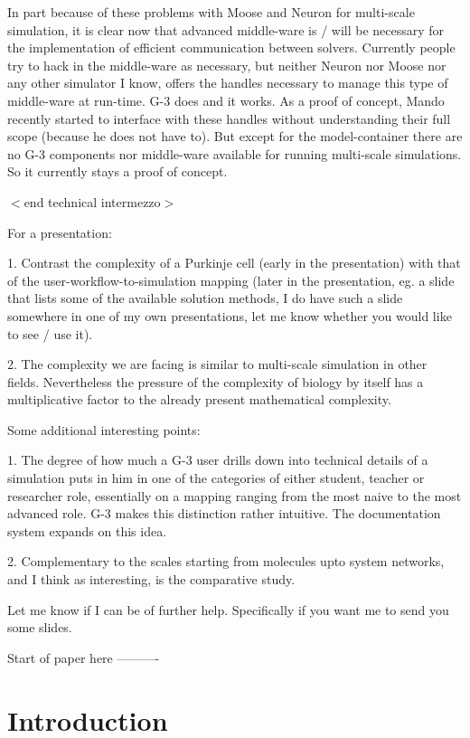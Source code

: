 \documentclass[12pt]{article}
\begin{document}
In part because of these problems with Moose and Neuron for
multi-scale simulation, it is clear now that advanced middle-ware is /
will be necessary for the implementation of efficient communication
between solvers.  Currently people try to hack in the middle-ware as
necessary, but neither Neuron nor Moose nor any other simulator I
know, offers the handles necessary to manage this type of middle-ware
at run-time.  G-3 does and it works.  As a proof of concept, Mando
recently started to interface with these handles without understanding
their full scope (because he does not have to).  But except for the
model-container there are no G-3 components nor middle-ware available
for running multi-scale simulations.  So it currently stays a proof of
concept.

$<$end technical intermezzo$>$

For a presentation:

1. Contrast the complexity of a Purkinje cell (early in the
presentation) with that of the user-workflow-to-simulation mapping
(later in the presentation, eg. a slide that lists some of the
available solution methods, I do have such a slide somewhere in one of
my own presentations, let me know whether you would like to see / use
it).

2. The complexity we are facing is similar to multi-scale simulation
in other fields.  Nevertheless the pressure of the complexity of
biology by itself has a multiplicative factor to the already present
mathematical complexity.

Some additional interesting points:

1. The degree of how much a G-3 user drills down into technical
details of a simulation puts in him in one of the categories of either
student, teacher or researcher role, essentially on a mapping ranging
from the most naive to the most advanced role.  G-3 makes this
distinction rather intuitive.  The documentation system expands on
this idea.

2. Complementary to the scales starting from molecules upto system
networks, and I think as interesting, is the comparative study.

Let me know if I can be of further help.  Specifically if you want me
to send you some slides.

\vspace{1cm}

{\LARGE Start of paper here ----------}

\section*{Introduction}
\end{document}

